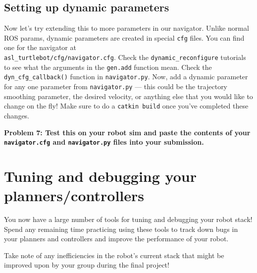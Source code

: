 \documentclass{article}
\begin{document}
\subsection{Setting up dynamic parameters}
Now let's try extending this to more parameters in our navigator. Unlike normal ROS params, dynamic parameters are created in special \texttt{cfg} files. You can find one for the navigator at \\ \texttt{asl\_turtlebot/cfg/navigator.cfg}. Check the \texttt{dynamic\_reconfigure} tutorials to see what the arguments in the \texttt{gen.add} function mean. Check the \texttt{dyn\_cfg\_callback()} function in \texttt{navigator.py}. Now, add a dynamic parameter for any one parameter from \texttt{navigator.py} --- this could be the trajectory smoothing parameter, the desired velocity, or anything else that you would like to change on the fly! Make sure to do a \texttt{catkin build} once you've completed these changes.

{\bf Problem 7: Test this on your robot sim and paste the contents of your \texttt{navigator.cfg} and \texttt{navigator.py} files into your submission.}

\section{Tuning and debugging your planners/controllers}
You now have a large number of tools for tuning and debugging your robot stack! Spend any remaining time practicing using these tools to track down bugs in your planners and controllers and improve the performance of your robot.

Take note of any inefficiencies in the robot's current stack that might be improved upon by your group during the final project!
\end{document}
